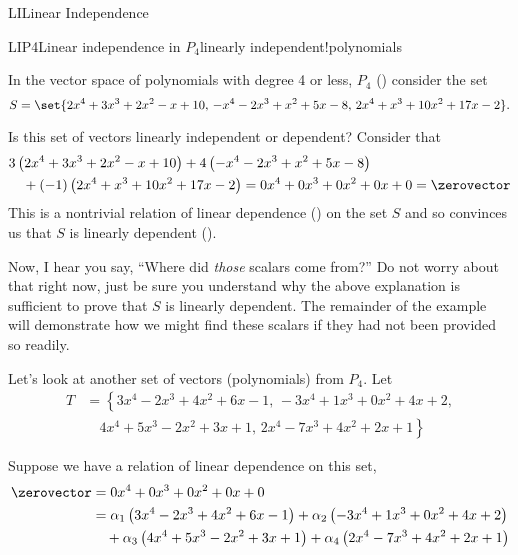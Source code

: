 \begin{subsect}{LI}{Linear Independence}
%
\begin{example}{LIP4}{Linear independence in $P_4$}{linearly independent!polynomials}
\begin{para}In the vector space of polynomials with degree 4 or less, $P_4$ () consider the set
%
\begin{equation*}
S=\set{
2x^4+3x^3+2x^2-x+10,\,
-x^4-2x^3+x^2+5x-8,\,
2x^4+x^3+10x^2+17x-2
}.
\end{equation*}
\end{para}
%
\begin{para}Is this set of vectors linearly independent or dependent?  Consider that
%
\begin{align*}
&3\left(2x^4+3x^3+2x^2-x+10\right)
+4\left(-x^4-2x^3+x^2+5x-8\right)\\
&\quad +(-1)\left(2x^4+x^3+10x^2+17x-2\right)
=0x^4+0x^3+0x^2+0x+0=\zerovector
\end{align*}
%
This is a nontrivial relation of linear dependence () on the set $S$ and so convinces us that $S$ is linearly dependent ().\end{para}
%
\begin{para}Now, I hear you say, ``Where did {\em those} scalars come from?''  Do not worry about that right now, just be sure you understand why the above explanation is sufficient to prove that $S$ is linearly dependent.  The remainder of the example will demonstrate how we might find these scalars if they had not been provided so readily.\end{para}
%
\begin{para}Let's look at another set of vectors (polynomials) from $P_4$.  Let
%
\begin{align*}
T&=\left\{
3x^4-2x^3+4x^2+6x-1,\,
-3x^4+1x^3+0x^2+4x+2,\right.\\
&\quad \left.4x^4+5x^3-2x^2+3x+1,\,
2x^4-7x^3+4x^2+2x+1\right\}
\end{align*}
\end{para}
%
\begin{para}Suppose we have a relation of linear dependence on this set,
%
\begin{align*}
\zerovector&=0x^4+0x^3+0x^2+0x+0\\
%
&=\alpha_1\left(3x^4-2x^3+4x^2+6x-1\right)+\alpha_2\left(-3x^4+1x^3+0x^2+4x+2\right)\\
&\quad +\alpha_3\left(4x^4+5x^3-2x^2+3x+1\right)+\alpha_4\left(2x^4-7x^3+4x^2+2x+1\right)
\end{align*}
\end{para}

\end{example}
\end{subsect}
